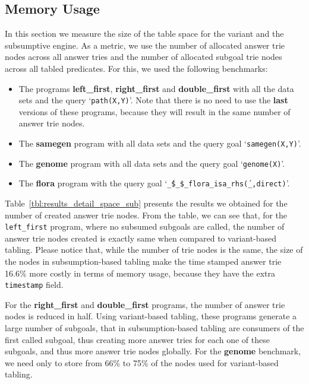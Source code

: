 


\subsection{Memory Usage}

In this section we measure the size of the table space for the variant and the subsumptive engine.
As a metric, we use the number of allocated answer trie nodes across all answer tries
and the number of allocated subgoal trie nodes across all tabled predicates.
For this, we used the following benchmarks:

\begin{itemize}
   \item The programs \textbf{left\_first}, \textbf{right\_first} and \textbf{double\_first} with
   all the data sets and the query `\texttt{path(X,Y)}'. Note that there is no need to use
   the \textbf{last} versions of these programs, because they will result in the same number of answer trie nodes.
   
   \item The \textbf{samegen} program with all data sets and the query goal `\texttt{samegen(X,Y)}'.
   
   \item The \textbf{genome} program with all data sets and the query goal `\texttt{genome(X)}'.
   
   \item The \textbf{flora} program with the query goal `\texttt{\'\_\$\_\$\_flora\_isa\_rhs\'(\_,direct)}'.
\end{itemize}

Table~\ref{tbl:results_detail_space_sub} presents the results we obtained for the number of created
answer trie nodes. From the table, we can see that,
for the \texttt{left\_first} program, where no subsumed subgoals are called, the number of answer trie nodes created is
exactly same when compared to variant-based tabling. Please notice that, while the number of trie nodes is
the same, the size of the nodes in subsumption-based tabling make
the time stamped answer trie 16.6\% more costly in terms of memory usage, because they
have the extra \texttt{timestamp} field.

For the \textbf{right\_first} and \textbf{double\_first} programs, the number of answer trie nodes
is reduced in half. Using variant-based tabling, these programs generate a large number of subgoals,
that in subsumption-based tabling are consumers of the first called subgoal, thus creating more
answer tries for each one of these subgoals, and thus more answer trie nodes globally.
For the \textbf{genome} benchmark, we need only to store from 66\% to 75\% of the nodes used for
variant-based tabling.

